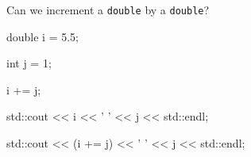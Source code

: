 Can we increment a \texttt{double} by a \texttt{double}?

\begin{console}

double i = 5.5;

int j = 1;

i += j;

std::cout << i << ' ' << j << std::endl;

std::cout << (i += j) << ' ' << j << std::endl;

\end{console}

